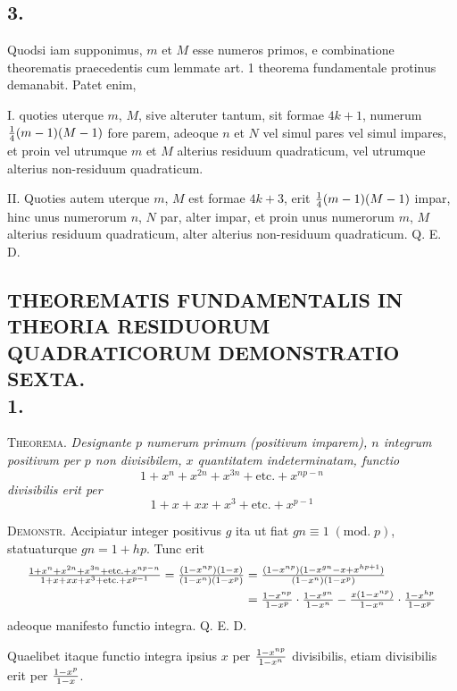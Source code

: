 \documentclass[twoside,12pt, showframe]{memoir}
\renewcommand{\pmod}[1]{\;(\textrm{mod.}\;#1)}
\let\oldfrac\frac
\def\frac#1#2{\mathchoice{\tfrac{#1}{#2}}{\oldfrac{#1}{#2}}{\genfrac{}{}{}{2}{#1}{#2\mathstrut}}{\genfrac{}{}{}{3}{#1}{#2\mathstrut}}}
\begin{document}
\subsection*{3.}
 
Quodsi iam supponimus, \(m\) et \(M\) esse numeros primos, e combinatione theorematis praecedentis cum lemmate art. 1 theorema fundamentale protinus demanabit. Patet enim,
 
I. quoties uterque \(m\), \(M\), sive alteruter tantum, sit formae \(4 k+1\), numerum \(\frac{1}{4}(m-1)(M-1)\) fore parem, adeoque \(n\) et \(N\) vel simul pares vel simul impares, et proin vel utrumque \(m\) et \(M\) alterius residuum quadraticum, vel utrumque alterius non-residuum quadraticum.
 
II. Quoties autem uterque \(m\), \(M\) est formae \(4 k+3\), erit \(\frac{1}{4}(m-1)(M-1)\) impar, hinc unus numerorum \(n\), \(N\) par, alter impar, et proin unus numerorum \(m\), \(M\) alterius residuum quadraticum, alter alterius non-residuum quadraticum. Q. E. D.\clearpage\noindent%

\subsection*{{\scriptsize THEOREMATIS FUNDAMENTALIS IN THEORIA RESIDUORUM QUADRATICORUM DEMONSTRATIO SEXTA.}\\
1.}
 
\textsc{Theorema.} \textit{Designante \(p\) numerum primum (positivum imparem), \(n\) integrum positivum per \(p\) non divisibilem, \(x\) quantitatem indeterminatam, functio}
\[1+x^{n}+x^{2 n}+x^{3 n}+\text{etc.}+x^{n p-n}\]
\textit{divisibilis erit per}
\[1+x+x x+x^{3}+\text{etc.}+x^{p-1}\]
 
\textsc{Demonstr.} Accipiatur integer positivus \(g\) ita ut fiat \(g n \equiv 1\pmod{p}\), statuaturque \(g n=1+h p\). Tunc erit
\[\begin{aligned}
\frac{1+x^{n}+x^{2 n}+x^{3 n}+\text{etc.}+x^{n p-n}}{1+x+x x+x^{3}+\text{etc.}+x^{p-1}}=\frac{(1-x^{n p})(1-x)}{(1-x^{n})(1-x^{p})} & =\frac{(1-x^{n p})(1-x^{g n}-x+x^{h p+1})}{(1-x^{n})(1-x^{p})} \\
& =\frac{1-x^{n p}}{1-x^{p}} \cdot \frac{1-x^{g n}}{1-x^{n}}-\frac{x(1-x^{n p})}{1-x^{n}} \cdot \frac{1-x^{h p}}{1-x^{p}}
\end{aligned}\]
adeoque manifesto functio integra. Q. E. D.
 
Quaelibet itaque functio integra ipsius \(x\) per \(\frac{1-x^{n p}}{1-x^{n}}\) divisibilis, etiam divisibilis erit per \(\frac{1-x^{p}}{1-x}\).
\end{document}
